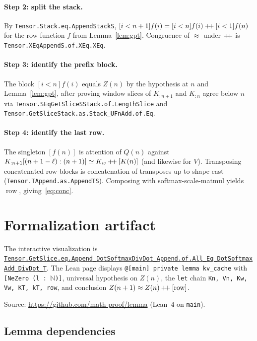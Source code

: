 \documentclass[11pt,a4paper]{article}
\newcommand{\rowop}{\operatorname{row}}
\newcommand{\concat}{\mathbin{+\mkern-4mu+}}
\newcommand{\XEq}{\approx}
\newcommand{\SEq}{\simeq}
\begin{document}
\paragraph{Step 2: split the stack.}
By \texttt{Tensor.Stack.eq.AppendStackS},
$[i<n+1]f(i)=[i<n]f(i)\concat[i<1]f(n)$ for the row function $f$ from Lemma~\ref{lem:gpt}.
Congruence of $\XEq$ under $\concat$ is \texttt{Tensor.XEqAppendS.of.XEq.XEq}.

\paragraph{Step 3: identify the prefix block.}
The block $[i<n]f(i)$ equals $Z(n)$ by the hypothesis at $n$ and Lemma~\ref{lem:gpt}, after proving window slices of $K_{:n+1}$ and $K_{:n}$ agree below $n$ via \texttt{Tensor.SEqGetSliceSStack.of.LengthSlice} and \texttt{Tensor.GetSliceStack.as.Stack\_UFnAdd.of.Eq}.

\paragraph{Step 4: identify the last row.}
The singleton $[f(n)]$ is attention of $Q(n)$ against
$K_{:n+1}[(n+1-\ell):(n+1)]\SEq K_w\concat[K(n)]$ (and likewise for $V$).
Transposing concatenated row-blocks is concatenation of transposes up to shape cast (\texttt{Tensor.TAppend.as.AppendTS}).
Composing with softmax-scale-matmul yields $\rowop$, giving~\eqref{eq:conc}.

\section{Formalization artifact}
\label{sec:artifact}

The interactive visualization is
\href{http://www.lemma.cn/lean/?module=Tensor.GetSlice.eq.Append_DotSoftmaxDivDot_Append.of.All_Eq_DotSoftmaxAdd_DivDot_T}{\texttt{Tensor.GetSlice.eq.Append\_DotSoftmaxDivDot\_Append.of.All\_Eq\_DotSoftmaxAdd\_DivDot\_T}}.
The Lean page displays \texttt{@[main] private lemma kv\_cache} with \texttt{[NeZero (l : $\mathbb{N}$)]}, universal hypothesis on $Z(n)$, the \texttt{let} chain \texttt{Kn, Vn, Kw, Vw, KT, kT, row}, and conclusion $Z(n+1)\XEq Z(n)\concat[\rowop]$.

Source: \url{https://github.com/math-proof/lemma} (Lean~4 on \texttt{main}).

\subsection{Lemma dependencies}
\label{sec:deps}
\end{document}
